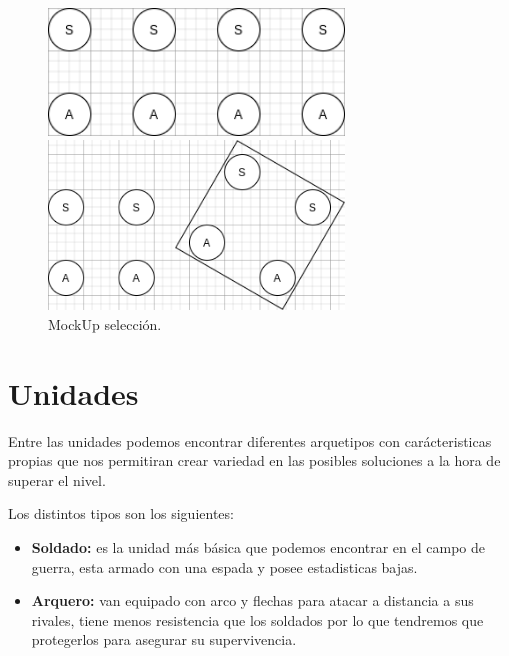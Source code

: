 \begin{figure}[ht]
\centering
\begin{minipage}[c]{0.45\linewidth}
	\hspace{1cm}
	\includegraphics[width=0.7\textwidth]{imagenes/non-selection.png}
\end{minipage}
\begin{minipage}[c]{0.45\linewidth}
	\includegraphics[width=0.7\textwidth]{imagenes/selection.png}
\end{minipage}	
\caption{MockUp selección.}
\label{fig:unit-selec}
\end{figure}

\section{Unidades}
Entre las unidades podemos encontrar diferentes arquetipos con carácteristicas propias
que nos permitiran crear variedad en las posibles soluciones a la hora de superar el
nivel.

Los distintos tipos son los siguientes:
\begin{itemize}
	\item \textbf{Soldado:} es la unidad más básica que podemos encontrar en el campo de
							guerra, esta armado con una espada y posee estadisticas
							bajas.
	\item \textbf{Arquero:} van equipado con arco y flechas para atacar a distancia a
							sus rivales, tiene menos resistencia que los soldados por
							lo que tendremos que protegerlos para asegurar su
							supervivencia.  
\end{itemize}


